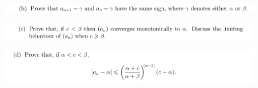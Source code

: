 \documentclass[12pt]{article}
\begin{document}
\begin{mdframed}
\includegraphics[width=400pt]{img/oxford-M2-analysis-I-4-6-b.png}
\end{mdframed}
\begin{mdframed}
\includegraphics[width=400pt]{img/oxford-M2-analysis-I-4-6-c.png}
\end{mdframed}
\begin{mdframed}
\includegraphics[width=400pt]{img/oxford-M2-analysis-I-4-6-d.png}
\end{mdframed}


\end{document}
